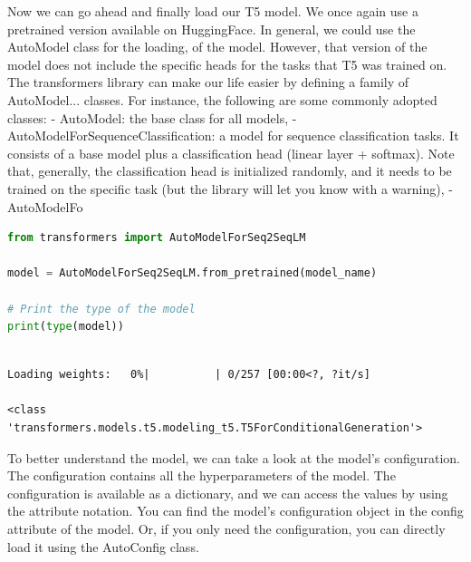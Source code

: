 \documentclass[../labs.tex]{subfiles}
\begin{document}
\noindent Now we can go ahead and finally load our T5 model. We once again use a pretrained version available on HuggingFace. In general, we could use the AutoModel class for the loading, of the model. However, that version of the model does not include the specific heads for the tasks that T5 was trained on. The transformers library can make our life easier by defining a family of AutoModel... classes. For instance, the following are some commonly adopted classes: - AutoModel: the base class for all models, - AutoModelForSequenceClassification: a model for sequence classification tasks. It consists of a base model plus a classification head (linear layer + softmax). Note that, generally, the classification head is initialized randomly, and it needs to be trained on the specific task (but the library will let you know with a warning), - AutoModelFo

\begin{lstlisting}[language=Python,basicstyle=\ttfamily\scriptsize,breaklines=true,breakatwhitespace=false,columns=fullflexible,keepspaces=true,numbers=none]
from transformers import AutoModelForSeq2SeqLM

model = AutoModelForSeq2SeqLM.from_pretrained(model_name)

# Print the type of the model
print(type(model))
\end{lstlisting}

\hypertarget{res:lab02-text-01-t5-ipynb-39-09f96574d7fd}{}

\begin{lstlisting}[basicstyle=\ttfamily\scriptsize,breaklines=true,breakatwhitespace=false,columns=fullflexible,keepspaces=true]

Loading weights:   0%|          | 0/257 [00:00<?, ?it/s]

<class 'transformers.models.t5.modeling_t5.T5ForConditionalGeneration'>

\end{lstlisting}



\noindent To better understand the model, we can take a look at the model's configuration. The configuration contains all the hyperparameters of the model. The configuration is available as a dictionary, and we can access the values by using the attribute notation. You can find the model's configuration object in the config attribute of the model. Or, if you only need the configuration, you can directly load it using the AutoConfig class.
\end{document}
